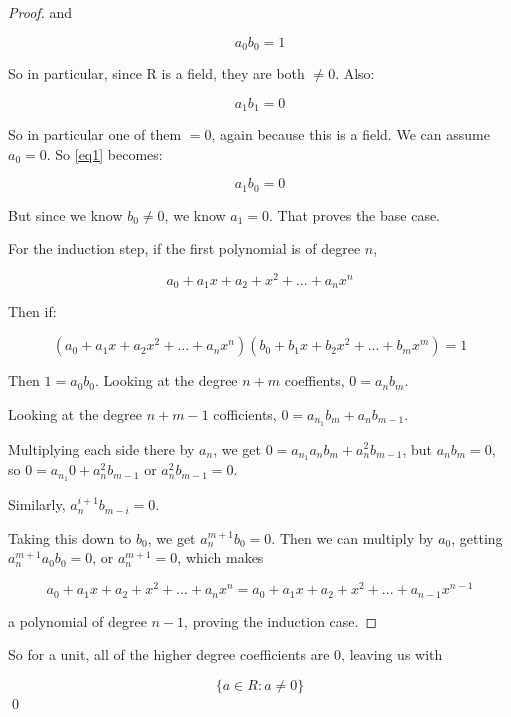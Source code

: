 \documentclass[11pt,oneside]{article}
\numberwithin{equation}{section}
\theoremstyle{definition}
\begin{document}
\begin{solution}
\begin{proof}
    and
    
    $$
    a_0 b_0 = 1
    $$
    
    So in particular, since R is a field, they are both $\neq 0$. Also: 

    $$
    a_1 b_1 = 0
    $$
    
    So in particular one of them $ = 0$, again because this is a field.
    We can assume $a_0 = 0$. So \ref{eq1} becomes:

    $$
    a_1 b_0 = 0
    $$
    
    But since we know $b_0 \neq 0$, we know $a_1 = 0$.  That proves the base case.

    For the induction step, if the first polynomial is of degree $n$,

    $$
    a_0 + a_1 x + a_2 + x^2 + ... + a_n x^ n
    $$

    Then if:

    $$
    (a_0 + a_1 x + a_2 x^2 + ... + a_n x^ n) (b_0 + b_1 x + b_2 x^2 + ... + b_m x^ m) = 1
    $$

    Then $1 = a_0 b_0$. Looking at the degree $n+m$ coeffients, $0 = a_n b_m$.

    Looking at the degree $n+m -1$ cofficients, $0 = a_{n_1} b_m + a_n b_{m-1}$.

    Multiplying each side there by $a_n$, we get $0 = a_{n_1} a_n b_m + a_n ^2 b_{m-1}$, but $a_n b_m = 0$, so
    $ 0 = a_{n_1} 0 + a_n^2 b_{m-1}$ or $a_n^2 b_{m-1} = 0$.

    Similarly, $ a_n^{i +1} b_{m - i} = 0$.

    Taking this down to $b_0$, we get $a_n^{m+1} b_0 = 0$.  Then we can multiply by $a_0$, getting
    $ a_n^{m+1} a_0 b_0 = 0$, or $a_n^{m+1} = 0$, which makes

    $$
    a_0 + a_1 x + a_2 + x^2 + ... + a_n x^ n = a_0 + a_1 x + a_2 + x^2 + ... + a_{n-1} x^ {n-1}
    $$

    a polynomial of degree $n-1$, proving the induction case.  
  \end{proof}

  So for a unit, all of the higher degree coefficients are 0, leaving us with

  $$
  \{ a \in R: a \neq 0 \}
  $$
  \qed
  
\end{solution}
\end{document}
